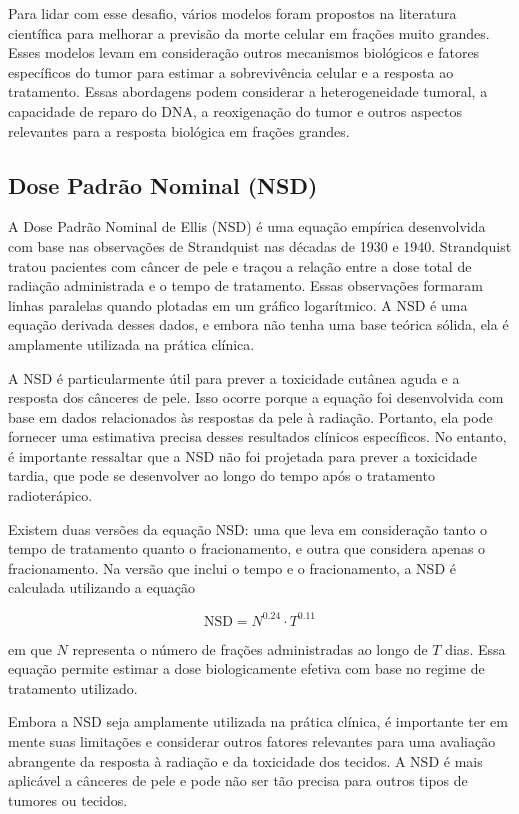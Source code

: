 \documentclass[11pt,a4paper]{article}
\begin{document}
	Para lidar com esse desafio, vários modelos foram propostos na literatura científica para melhorar a previsão da morte celular em frações muito grandes. Esses modelos levam em consideração outros mecanismos biológicos e fatores específicos do tumor para estimar a sobrevivência celular e a resposta ao tratamento. Essas abordagens podem considerar a heterogeneidade tumoral, a capacidade de reparo do DNA, a reoxigenação do tumor e outros aspectos relevantes para a resposta biológica em frações grandes.

\subsection{Dose Padrão Nominal (NSD)}

	A Dose Padrão Nominal de Ellis (NSD) é uma equação empírica desenvolvida com base nas observações de Strandquist nas décadas de 1930 e 1940. Strandquist tratou pacientes com câncer de pele e traçou a relação entre a dose total de radiação administrada e o tempo de tratamento. Essas observações formaram linhas paralelas quando plotadas em um gráfico logarítmico. A NSD é uma equação derivada desses dados, e embora não tenha uma base teórica sólida, ela é amplamente utilizada na prática clínica.

	A NSD é particularmente útil para prever a toxicidade cutânea aguda e a resposta dos cânceres de pele. Isso ocorre porque a equação foi desenvolvida com base em dados relacionados às respostas da pele à radiação. Portanto, ela pode fornecer uma estimativa precisa desses resultados clínicos específicos. No entanto, é importante ressaltar que a NSD não foi projetada para prever a toxicidade tardia, que pode se desenvolver ao longo do tempo após o tratamento radioterápico.

	Existem duas versões da equação NSD: uma que leva em consideração tanto o tempo de tratamento quanto o fracionamento, e outra que considera apenas o fracionamento. Na versão que inclui o tempo e o fracionamento, a NSD é calculada utilizando a equação

	\begin{equation}
		\text{NSD} = N^{0.24} \cdot T^{0.11}
	\end{equation}
	
	em que $N$ representa o número de frações administradas ao longo de $T$ dias. Essa equação permite estimar a dose biologicamente efetiva com base no regime de tratamento utilizado.

	Embora a NSD seja amplamente utilizada na prática clínica, é importante ter em mente suas limitações e considerar outros fatores relevantes para uma avaliação abrangente da resposta à radiação e da toxicidade dos tecidos. A NSD é mais aplicável a cânceres de pele e pode não ser tão precisa para outros tipos de tumores ou tecidos.
\end{document}
